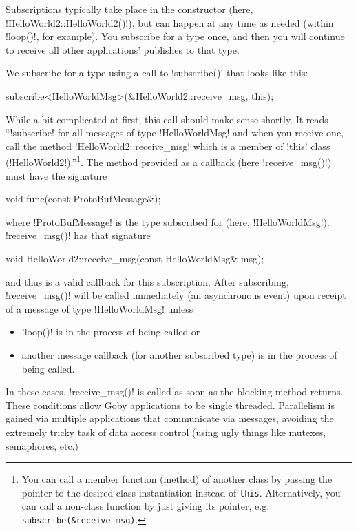 Subscriptions typically take place in the constructor (here, !HelloWorld2::HelloWorld2()!), but can happen at any time as needed (within !loop()!, for example). You subscribe for a type once, and then you will continue to receive all other applications' publishes to that type.

We subscribe for a type using a call to !subscribe()! that looks like this:
\begin{boxedverbatim}
subscribe<HelloWorldMsg>(&HelloWorld2::receive_msg, this);
\end{boxedverbatim}
\resetbvlinenumber

While a bit complicated at first, this call should make sense shortly. It reads ``!subscribe! for all messages of type !HelloWorldMsg! and when you receive one, call the method !HelloWorld2::receive_msg! which is a member of !this! class (!HelloWorld2!).''\footnote{You can call a member function (method) of another class by passing the pointer to the desired class instantiation instead of \texttt{this}. Alternatively, you can call a non-class function by just giving its pointer, e.g. \texttt{subscribe(\&receive\_msg)}.}. The method provided as a callback (here !receive_msg()!) must have the signature
\begin{boxedverbatim}
void func(const ProtoBufMessage&); 
\end{boxedverbatim}
\resetbvlinenumber
where !ProtoBufMessage! is the type subscribed for (here, !HelloWorldMsg!). !receive_msg()! has that signature
\begin{boxedverbatim}
void HelloWorld2::receive_msg(const HelloWorldMsg& msg);
\end{boxedverbatim}
\resetbvlinenumber
and thus is a valid callback for this subscription. After subscribing, !receive_msg()! will be called immediately (an \gls{asynchronous} event) upon receipt of a message of type !HelloWorldMsg! unless
\begin{itemize}
\item !loop()! is in the process of being called or
\item another message callback (for another subscribed type) is in the process of being called.
\end{itemize}
In these cases, !receive_msg()! is called as soon as the blocking method returns. These conditions allow Goby applications to be single threaded. Parallelism is gained via multiple applications that communicate via messages, avoiding the extremely tricky task of data access control (using ugly things like mutexes, semaphores, etc.)

